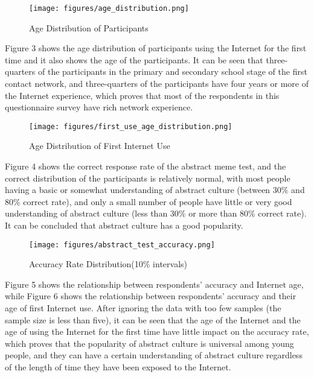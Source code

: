 \documentclass[12pt,a4paper]{ctexart}
\theoremstyle{MyLineTheoremStyle}
\theoremstyle{MyBlockTheoremStyle}
\theoremstyle{MySubsubsectionStyle}
\begin{document}
\begin{figure}[htbp]
    \centering
    \texttt{[image: figures/age\_distribution.png]}
    \caption{Age Distribution of Participants}
    \label{fig:age_distribution}
\end{figure}
\newpage

Figure 3 shows the age distribution of participants using the Internet for the first time and it also shows the age of the participants. It can be seen that three-quarters of the participants in the primary and secondary school stage of the first contact network, and three-quarters of the participants have four years or more of the Internet experience, which proves that most of the respondents in this questionnaire survey have rich network experience.

\begin{figure}[htbp]
    \centering
    \texttt{[image: figures/first\_use\_age\_distribution.png]}
    \caption{Age Distribution of First Internet Use}
    \label{fig:first_use_age_distribution}
\end{figure}
\newpage

Figure 4 shows the correct response rate of the abstract meme test, and the correct distribution of the participants is relatively normal, with most people having a basic or somewhat understanding of abstract culture (between 30\% and 80\% correct rate), and only a small number of people have little or very good understanding of abstract culture (less than 30\% or more than 80\% correct rate). It can be concluded that abstract culture has a good popularity.

\begin{figure}[htbp]
    \centering
    \texttt{[image: figures/abstract\_test\_accuracy.png]}
    \caption{Accuracy Rate Distribution(10\% intervals)}
    \label{fig:abstract_test_accuracy}
\end{figure}
\newpage

Figure 5 shows the relationship between respondents' accuracy and Internet age, while Figure 6 shows the relationship between respondents' accuracy and their age of first Internet use. After ignoring the data with too few samples (the sample size is less than five), it can be seen that the age of the Internet and the age of using the Internet for the first time have little impact on the accuracy rate, which proves that the popularity of abstract culture is universal among young people, and they can have a certain understanding of abstract culture regardless of the length of time they have been exposed to the Internet.
\end{document}
